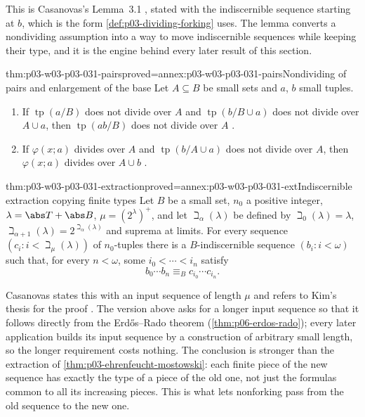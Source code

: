 This is Casanovas's Lemma~3.1 \cite[p.~267]{Casanovas2007Simplicity},
stated with the indiscernible sequence starting at \(b\), which is the
form \cref{def:p03-dividing-forking} uses.  The lemma converts a
nondividing assumption into a way to move indiscernible sequences while
keeping their type, and it is the engine behind every later result of
this section.

\begin{hblemma}{thm:p03-w03-p03-031-pairs}{proved=annex:p03-w03-p03-031-pairs}{Nondividing of pairs and enlargement of the base}
Let \(A\subseteq B\) be small sets and \(a\), \(b\) small tuples.
\begin{enumerate}
  \item If \(\operatorname{tp}(a/B)\) does not divide over \(A\) and
        \(\operatorname{tp}(b/B\cup a)\) does not divide over \(A\cup a\),
        then \(\operatorname{tp}(ab/B)\) does not divide over \(A\)
        \cite[Proposition~3.4, p.~267]{Casanovas2007Simplicity}.
  \item If \(\varphi(x;a)\) divides over \(A\) and
        \(\operatorname{tp}(b/A\cup a)\) does not divide over \(A\), then
        \(\varphi(x;a)\) divides over \(A\cup b\)
        \cite[Proposition~3.5, p.~267]{Casanovas2007Simplicity}.
\end{enumerate}
\end{hblemma}

\begin{hblemma}{thm:p03-w03-p03-031-extraction}{proved=annex:p03-w03-p03-031-ext}{Indiscernible extraction copying finite types}
Let \(B\) be a small set, \(n_0\) a positive integer,
\(\lambda=\abs T+\abs B\), \(\mu=(2^\lambda)^+\), and let
\(\beth_\alpha(\lambda)\) be defined by \(\beth_0(\lambda)=\lambda\),
\(\beth_{\alpha+1}(\lambda)=2^{\beth_\alpha(\lambda)}\) and suprema at
limits.  For every sequence \((c_i:i<\beth_\mu(\lambda))\) of
\(n_0\)-tuples there is a \(B\)-indiscernible sequence
\((b_i:i<\omega)\) such that, for every \(n<\omega\), some
\(i_0<\cdots<i_n\) satisfy
\[
 b_0\cdots b_n\equiv_B c_{i_0}\cdots c_{i_n}.
\]
\end{hblemma}

Casanovas states this with an input sequence of length \(\mu\) and refers
to Kim's thesis for the proof \cite[Lemma~1.1, p.~264]{Casanovas2007Simplicity}.
The version above asks for a longer input sequence so that it follows
directly from the Erd\H{o}s--Rado theorem (\cref{thm:p06-erdos-rado}); every
later application builds its input sequence by a construction of
arbitrary small length, so the longer requirement costs nothing.  The
conclusion is stronger than the extraction of
\cref{thm:p03-ehrenfeucht-mostowski}: each finite piece of the new
sequence has exactly the type of a piece of the old one, not just the
formulas common to all its increasing pieces.  This is what lets
nonforking pass from the old sequence to the new one.

